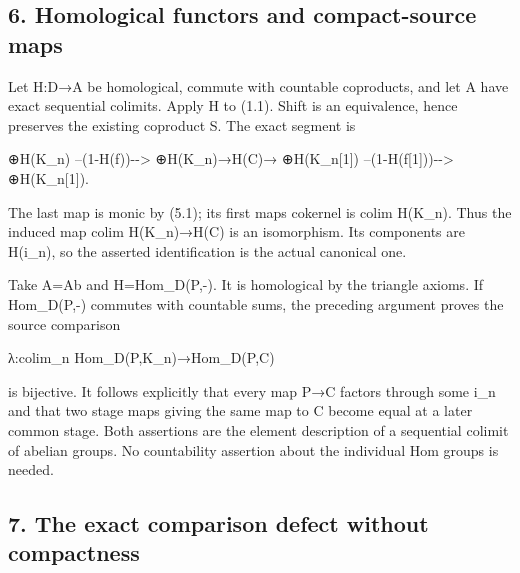 \documentclass[11pt]{article}
\begin{document}
\subsection{6. Homological functors and compact-source maps}\label{proofs-10139-10427-homological-functors-and-compact-source-maps}

Let H:\allowbreak{}D\allowbreak{}→A be homological,\allowbreak{} commute with countable coproducts,\allowbreak{} and let A have exact sequential colimits. Apply H to (1.1)\allowbreak{}. Shift is an equivalence,\allowbreak{} hence preserves the existing coproduct S. The exact segment is

\allowbreak{}⊕H(K\_\allowbreak{}n)\allowbreak{} --(1-H(f)\allowbreak{})\allowbreak{}-\allowbreak{}-> \allowbreak{}⊕H(K\_\allowbreak{}n)\allowbreak{}\allowbreak{}→H(C)\allowbreak{}\allowbreak{}→ \allowbreak{}⊕H(K\_\allowbreak{}n[1]\allowbreak{})\allowbreak{} --(1-H(f[1]\allowbreak{})\allowbreak{})\allowbreak{}-\allowbreak{}-> \allowbreak{}⊕H(K\_\allowbreak{}n[1]\allowbreak{})\allowbreak{}.

The last map is monic by (5.1)\allowbreak{}; its first map\textquotesingle s cokernel is colim H(K\_\allowbreak{}n)\allowbreak{}. Thus the induced map colim H(K\_\allowbreak{}n)\allowbreak{}\allowbreak{}→H(C)\allowbreak{} is an isomorphism. Its components are H(i\_\allowbreak{}n)\allowbreak{},\allowbreak{} so the asserted identification is the actual canonical one.

Take A\allowbreak{}=Ab and H\allowbreak{}=Hom\_\allowbreak{}D(P,\allowbreak{}-)\allowbreak{}. It is homological by the triangle axioms. If Hom\_\allowbreak{}D(P,\allowbreak{}-)\allowbreak{} commutes with countable sums,\allowbreak{} the preceding argument proves the source comparison

λ:\allowbreak{}colim\_\allowbreak{}n Hom\_\allowbreak{}D(P,\allowbreak{}K\_\allowbreak{}n)\allowbreak{}\allowbreak{}→Hom\_\allowbreak{}D(P,\allowbreak{}C)\allowbreak{}

is bijective. It follows explicitly that every map P\allowbreak{}→C factors through some i\_\allowbreak{}n and that two stage maps giving the same map to C become equal at a later common stage. Both assertions are the element description of a sequential colimit of abelian groups. No countability assertion about the individual Hom groups is needed.

\subsection{7. The exact comparison defect without compactness}\label{proofs-10139-10427-the-exact-comparison-defect-without-compactness}
\end{document}
